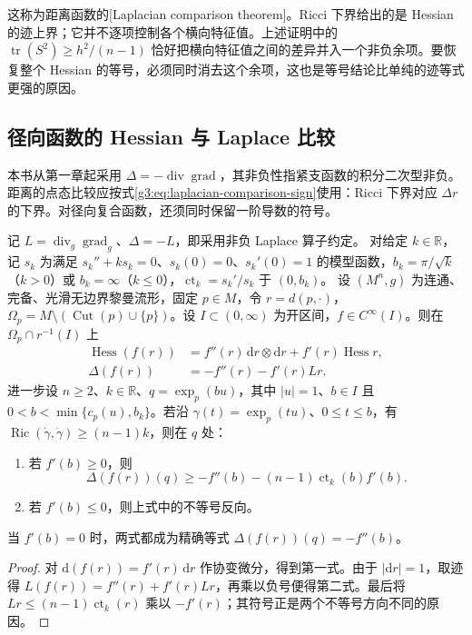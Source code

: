 这称为距离函数的[Laplacian comparison theorem]。Ricci 下界给出的是 Hessian 的迹上界；它并不逐项控制各个横向特征值。上述证明中的
\(\operatorname{tr}(S^2)\ge h^2/(n-1)\)
恰好把横向特征值之间的差异并入一个非负余项。要恢复整个 Hessian 的等号，必须同时消去这个余项，这也是等号结论比单纯的迹等式更强的原因。

\subsection{径向函数的 Hessian 与 Laplace 比较}
\label{g3:subsec:0703:04}

本书从第一章起采用
\(\Delta=-\operatorname{div}\operatorname{grad}\)，其非负性指紧支函数的积分二次型非负。距离的点态比较应按式\eqref{g3:eq:laplacian-comparison-sign}使用：Ricci 下界对应 \(\Delta r\) 的下界。对径向复合函数，还须同时保留一阶导数的符号。

\begin{proposition}\label{g3:prop:radial-function-laplacian}
	记 \(L=\operatorname{div}_g\operatorname{grad}_g\)、\(\Delta=-L\)，即采用非负 Laplace 算子约定。
	对给定 \(k\in\mathbb R\)，记 \(s_k\) 为满足 \(s_k''+ks_k=0\)、\(s_k(0)=0\)、\(s_k'(0)=1\) 的模型函数，\(b_k=\pi/\sqrt k\)（\(k>0\)）或 \(b_k=\infty\)（\(k\le0\)），\(\operatorname{ct}_k=s_k'/s_k\) 于 \((0,b_k)\)。
	设 \((M^n,g)\) 为连通、完备、光滑无边界黎曼流形，固定 \(p\in M\)，令 \(r=d(p,\cdot)\)，\(\Omega_p=M\setminus(\operatorname{Cut}(p)\cup\{p\})\)。设 \(I\subset(0,\infty)\) 为开区间，\(f\in C^\infty(I)\)。则在 \(\Omega_p\cap r^{-1}(I)\) 上
	\begin{align}
		\operatorname{Hess}(f(r))
		&=f''(r)\,\mathrm dr\otimes\mathrm dr
			+f'(r)\operatorname{Hess}r,\label{g3:eq:radial-function-hessian}\\
		\Delta(f(r))
		&=-f''(r)-f'(r)Lr.\label{g3:eq:radial-function-laplacian}
	\end{align}
	进一步设 \(n\ge2\)、\(k\in\mathbb R\)、\(q=\exp_p(bu)\)，其中 \(|u|=1\)、\(b\in I\) 且 \(0<b<\min\{c_p(u),b_k\}\)。若沿 \(\gamma(t)=\exp_p(tu)\)、\(0\le t\le b\)，有 \(\operatorname{Ric}(\dot\gamma,\dot\gamma)\ge(n-1)k\)，则在 \(q\) 处：
	\begin{enumerate}
		\item 若 \(f'(b)\ge0\)，则
		\[
			\Delta(f(r))(q)\ge
			-f''(b)-(n-1)\operatorname{ct}_k(b)f'(b).
		\]
		\item 若 \(f'(b)\le0\)，则上式中的不等号反向。
	\end{enumerate}
	当 \(f'(b)=0\) 时，两式都成为精确等式 \(\Delta(f(r))(q)=-f''(b)\)。
\end{proposition}
\begin{proof}
	对 \(\mathrm d(f(r))=f'(r)\,\mathrm dr\) 作协变微分，得到第一式。由于 \(|\mathrm dr|=1\)，取迹得
	\(L(f(r))=f''(r)+f'(r)Lr\)，再乘以负号便得第二式。最后将
	\(Lr\le(n-1)\operatorname{ct}_k(r)\)
	乘以 \(-f'(r)\)；其符号正是两个不等号方向不同的原因。
\end{proof}

